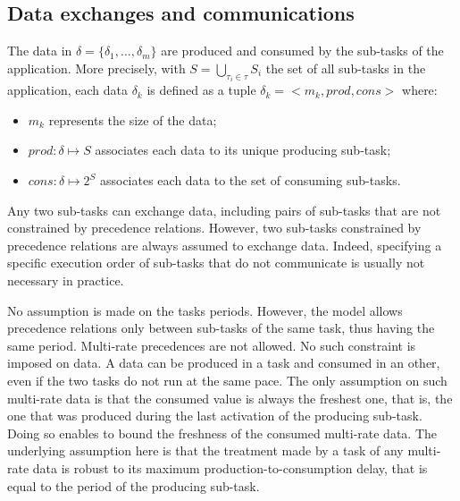 \documentclass[main.tex]{subfiles}
\begin{document}
\subsection{Data exchanges and communications}
The data in $\delta = \{ \delta_1 , \ldots , \delta_m \}$ are produced and consumed by the sub-tasks of the application. More precisely, with $S = \underset{\tau_i \in \tau}{\bigcup} S_i$ the set of all sub-tasks in the application, each data $\delta_k$ is defined as a tuple $\delta_k = < m_k , prod , cons >$ where:
\begin{itemize}
    \item $m_k$ represents the size of the data;
    \item $prod : \delta \mapsto S$ associates each data to its unique producing sub-task;
    \item $cons : \delta \mapsto 2^S$ associates each data to the set of consuming sub-tasks.
\end{itemize}

Any two sub-tasks can exchange data, including pairs of sub-tasks that are not constrained by precedence relations. However, two sub-tasks constrained by precedence relations are always assumed to exchange data. Indeed, specifying a specific execution order of sub-tasks that do not communicate is usually not necessary in practice.

No assumption is made on the tasks periods. However, the model allows precedence relations only between sub-tasks of the same task, thus having the same period. Multi-rate precedences are not allowed. No such constraint is imposed on data. A data can be produced in a task and consumed in an other, even if the two tasks do not run at the same pace. The only assumption on such multi-rate data is that the consumed value is always the freshest one, that is, the one that was produced during the last activation of the producing sub-task. Doing so enables to bound the freshness of the consumed multi-rate data. The underlying assumption here is that the treatment made by a task of any multi-rate data is robust to its maximum production-to-consumption delay, that is equal to the period of the producing sub-task.
\end{document}

